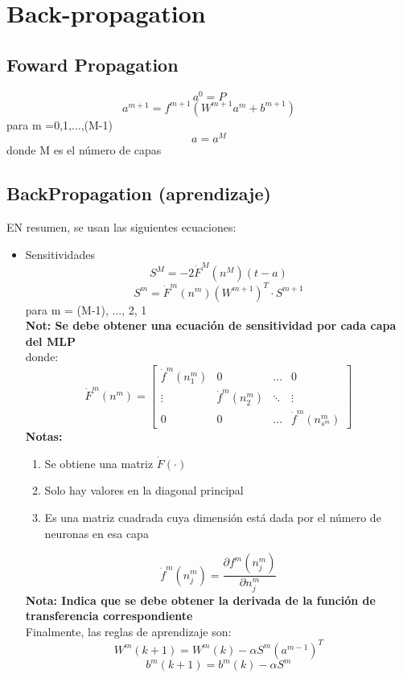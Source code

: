 \documentclass{article}
\begin{document}
\section{Back-propagation}
\subsection{Foward Propagation}
$$ a^0 = P $$
$$ a^{m+1} = f^{m+1}(W^{m+1} a^{m} + b^{m+1}) $$ para m =0,1,$\dots$,(M-1)
$$ a = a^M $$ donde M es el número de capas
\subsection{BackPropagation (aprendizaje)}
EN resumen, se usan las siguientes ecuaciones:
\begin{itemize}
	\item Sensitividades
	$$ S^M = -2\dot{F}^M (n^M)(t-a) $$
	$$ S^m = \dot{F}^m (n^m)(W^{m + 1})^T\cdot S^{m + 1} $$
	para m = (M-1), ..., 2, 1\\
	\textbf{Not: Se debe obtener una ecuación de sensitividad por cada capa del MLP}\\
	donde:
	\[\dot{F}^m(n^m)= 
	\begin{bmatrix}
	\dot{f}^m(n_{1}^m) & 0 & \dots & 0\\
	\vdots & \dot{f}^m(n_{2}^m) &\ddots & \vdots\\
	0 & 0 & \dots &\dot{f}^m(n_{s^m}^m)
	\end{bmatrix}
	\]
	\textbf{Notas:}
	\begin{enumerate}
		\item Se obtiene una matriz $\dot{F}(\cdot) $
		\item Solo hay valores en la diagonal principal
		\item Es una matriz cuadrada cuya dimensión está dada por el número de neuronas en esa capa
	\end{enumerate}
	$$ \dot{f}^m(n_{j}^m) = \frac{\partial f^m (n_j^m)}{\partial n^m_j} $$ 
	\textbf{Nota: Indica que se debe obtener la derivada de la función de transferencia correspondiente}\\
	Finalmente, las reglas de aprendizaje son:
	$$ W^m(k + 1) = W^m(k) - \alpha S^m(a^{m-1})^T $$
	$$ b^m(k + 1) = b^m(k) - \alpha S^m $$
\end{itemize}
\end{document}
